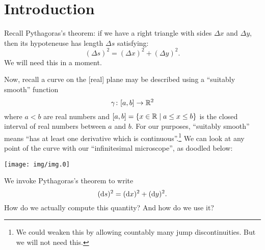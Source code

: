 \section{Introduction}

Recall Pythagoras's theorem: if we have a right triangle with sides
$\Delta x$ and $\Delta y$, then its hypoteneuse has length $\Delta s$ satisfying:
\begin{equation}
(\Delta s)^{2} = (\Delta x)^{2} + (\Delta y)^{2}.
\end{equation}
We will need this in a moment.

Now, recall a curve on the [real] plane may be described using a
``suitably smooth'' function
\begin{equation}
\gamma\colon [a,b]\to\mathbb{R}^{2}
\end{equation}
where $a < b$ are real numbers and $[a,b] = \{x\in\mathbb{R}\mid a\leq x\leq b\}$
is the closed interval of real numbers between $a$ and $b$. For our
purposes, ``suitably smooth'' means ``has at least one derivative which
is continuous''.\footnote{We could weaken this by allowing countably many
jump discontinuities. But we will not need this.}
We can look at any point of the curve with our ``infinitesimal
microscope'', as doodled below:
\begin{center}
  \texttt{[image: img/img.0]}
\end{center}
We invoke Pythagoras's theorem to write
\begin{equation}
(\mathrm{d} s)^{2} =  (\mathrm{d} x)^{2} + (\mathrm{d} y)^{2}.
\end{equation}
How do we actually compute this quantity? And how do we use it?

